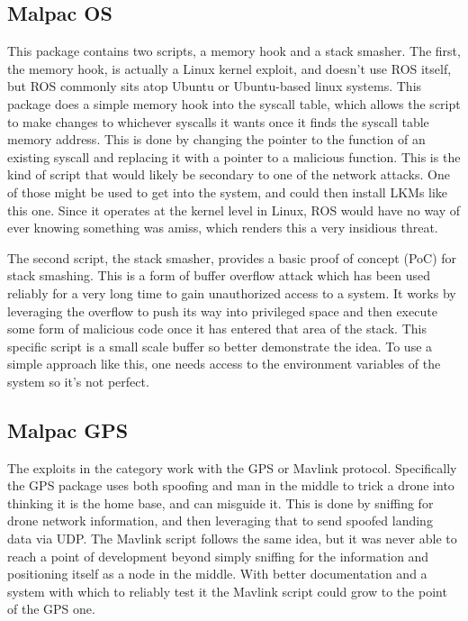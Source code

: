\documentclass[IEEEtran,letterpaper,10pt,notitlepage,draftclsnofoot,onecolumn]{article}
\begin{document}
\subsection{Malpac OS}
This package contains two scripts, a memory hook and a stack smasher.
The first, the memory hook, is actually a Linux kernel exploit, and doesn't use ROS itself, but ROS commonly sits atop Ubuntu or Ubuntu-based linux systems.
This package does a simple memory hook into the syscall table, which allows the script to make changes to whichever syscalls it wants once it finds the syscall table memory address.
This is done by changing the pointer to the function of an existing syscall and replacing it with a pointer to a malicious function.
This is the kind of script that would likely be secondary to one of the network attacks. One of those might be used to get into the system, and could then install LKMs like this one. Since it operates at the kernel level in Linux, ROS would have no way of ever knowing something was amiss, which renders this a very insidious threat.

The second script, the stack smasher, provides a basic proof of concept (PoC) for stack smashing.
This is a form of buffer overflow attack which has been used reliably for a very long time to gain unauthorized access to a system.
It works by leveraging the overflow to push its way into privileged space and then execute some form of malicious code once it has entered that area of the stack.
This specific script is a small scale buffer so better demonstrate the idea.
To use a simple approach like this, one needs access to the environment variables of the system so it's not perfect.

\subsection{Malpac GPS}
The exploits in the category work with the GPS or Mavlink protocol.
Specifically the GPS package uses both spoofing and man in the middle to trick a drone into thinking it is the home base, and can misguide it.
This is done by sniffing for drone network information, and then leveraging that to send spoofed landing data via UDP.
The Mavlink script follows the same idea, but it was never able to reach a point of development beyond simply sniffing for the information and positioning itself as a node in the middle.
With better documentation and a system with which to reliably test it the Mavlink script could grow to the point of the GPS one.
\end{document}
